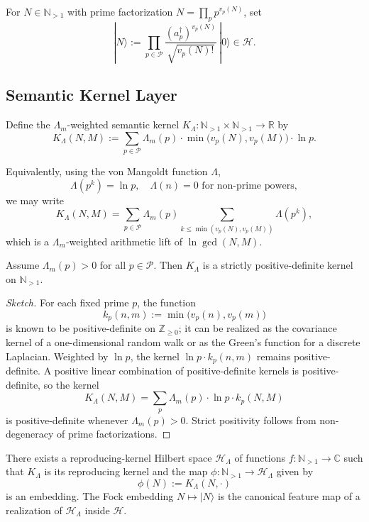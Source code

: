 \documentclass[11pt]{article}
\begin{document}
For $N \in \mathbb{N}_{>1}$ with prime factorization
$N = \prod_{p} p^{v_p(N)}$, set
\[
  |N\rangle
    := \prod_{p \in \mathcal{P}}
      \frac{(a_p^\dagger)^{v_p(N)}}{\sqrt{v_p(N)!}} \, |0\rangle
  \in \mathcal{H}.
\]

\subsection{Semantic Kernel Layer}
\label{subsec:semantic-kernel}

\begin{definition}
Define the $\Lambda_m$-weighted semantic kernel
$K_{\Lambda} : \mathbb{N}_{>1} \times \mathbb{N}_{>1} \to \mathbb{R}$
by
\[
  K_{\Lambda}(N,M)
    := \sum_{p \in \mathcal{P}}
       \Lambda_m(p) \cdot \min\bigl(v_p(N), v_p(M)\bigr) \cdot \ln p.
\]
\end{definition}

Equivalently, using the von Mangoldt function $\Lambda$,
\[
  \Lambda(p^k) = \ln p, \quad \Lambda(n) = 0
  \text{ for non-prime powers},
\]
we may write
\[
  K_{\Lambda}(N,M)
    = \sum_{p \in \mathcal{P}} \Lambda_m(p)
      \sum_{k \le \min(v_p(N), v_p(M))} \Lambda(p^k),
\]
which is a $\Lambda_m$-weighted arithmetic lift of $\ln \gcd(N,M)$.

\begin{theorem}
Assume $\Lambda_m(p) > 0$ for all $p \in \mathcal{P}$. Then
$K_{\Lambda}$ is a strictly positive-definite kernel on
$\mathbb{N}_{>1}$.
\end{theorem}

\begin{proof}[Sketch]
For each fixed prime $p$, the function
\[
  k_p(n,m)
    := \min\bigl(v_p(n), v_p(m)\bigr)
\]
is known to be positive-definite on $\mathbb{Z}_{\ge 0}$; it can be
realized as the covariance kernel of a one-dimensional random walk
or as the Green's function for a discrete Laplacian. Weighted by
$\ln p$, the kernel $\ln p \cdot k_p(n,m)$ remains positive-definite.
A positive linear combination of positive-definite kernels is
positive-definite, so the kernel
\[
  K_{\Lambda}(N,M)
    = \sum_{p} \Lambda_m(p) \cdot \ln p \cdot k_p(N,M)
\]
is positive-definite whenever $\Lambda_m(p) > 0$. Strict positivity
follows from non-degeneracy of prime factorizations. \qedhere
\end{proof}

\begin{corollary}
There exists a reproducing-kernel Hilbert space $\mathscr{H}_{\Lambda}$
of functions $f : \mathbb{N}_{>1} \to \mathbb{C}$ such that
$K_{\Lambda}$ is its reproducing kernel and the map
$\phi : \mathbb{N}_{>1} \to \mathscr{H}_{\Lambda}$ given by
\[
  \phi(N) := K_{\Lambda}(N,\cdot)
\]
is an embedding. The Fock embedding $N \mapsto |N\rangle$ is the
canonical feature map of a realization of $\mathscr{H}_{\Lambda}$
inside $\mathcal{H}$.
\end{corollary}
\end{document}
